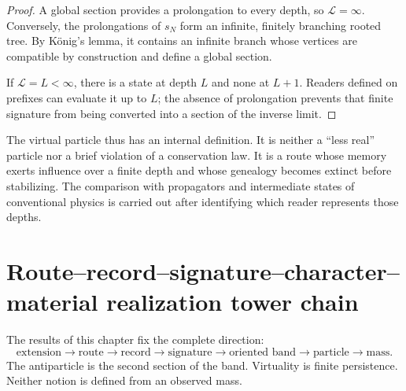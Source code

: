 \begin{proof}
A global section provides a prolongation to every depth, so
\(\mathcal L=\infty\). Conversely, the prolongations of \(s_N\)
form an infinite, finitely branching rooted tree. By König's
lemma, it contains an infinite branch whose vertices are compatible by
construction and define a global section.

If \(\mathcal L=L<\infty\), there is a state at depth \(L\) and none
at \(L+1\). Readers defined on prefixes can evaluate it up to
\(L\); the absence of prolongation prevents that finite signature from being converted into a
section of the inverse limit.
\end{proof}

The virtual particle thus has an internal definition. It is neither a
``less real'' particle nor a brief violation of a conservation law. It is a
route whose memory exerts influence over a finite depth and whose genealogy
becomes extinct before stabilizing. The comparison with propagators and intermediate
states of conventional physics is carried out after identifying which
reader represents those depths.

\section{Route–record–signature–character–material realization tower chain}

The results of this chapter fix the complete direction:
\[
\boxed{
\text{extension}\to
\text{route}\to
\text{record}\to
\text{signature}\to
\text{oriented band}\to
\text{particle}\to
\text{mass}.}
\]
The antiparticle is the second section of the band. Virtuality is finite
persistence. Neither notion is defined from an observed
mass.
